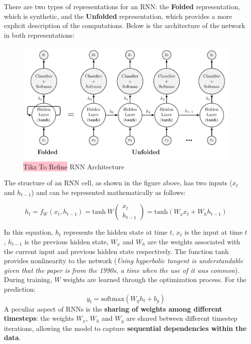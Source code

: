 There are two types of representations for an RNN: the \textbf{Folded} representation, which is synthetic, and the \textbf{Unfolded} representation, which provides a more explicit description of the computations. Below is the architecture of the network in both representations:

\begin{figure}[!htbp]
    \centering
    \includegraphics[width = 0.9\linewidth]{tikz/chapter6 - RNN Architecture.pdf}
    \caption{{\color{red}\colorbox{pink}{Tikz To Refine}} RNN Architecture}
\end{figure}

The structure of an RNN cell, as shown in the figure above, has two inputs ($x_t$ and $h_{t-1}$) and can be represented mathematically as follows:

$$
h_t = f_W(x_t,h_{t-1}) = \text{tanh} \ W \begin{pmatrix}
x_t \\
h_{t-1}
\end{pmatrix} = \text{tanh}(W_xx_t + W_hh_{t-1})
$$

In this equation, $h_t$ represents the hidden state at time $t$, $x_t$ is the input at time $t$, $h_{t-1}$ is the previous hidden state, $W_x$ and $W_h$ are the weights associated with the current input and previous hidden state respectively. The function $\text{tanh}$ provides nonlinearity to the network (\textit{Using hyperbolic tangent is understandable given that the paper is from the 1990s, a time when the use of it was common}). During training, $W$ weights are learned through the optimization process. For the prediction:
$$
y_t = \text{softmax}(W_y h_t + b_y)
$$
A peculiar aspect of RNNs is the \textbf{sharing of weights among different timesteps}: the weights $W_x$, $W_h$ and $W_y$ are shared between different timestep iterations, allowing the model to capture \textbf{sequential dependencies within the data}.

